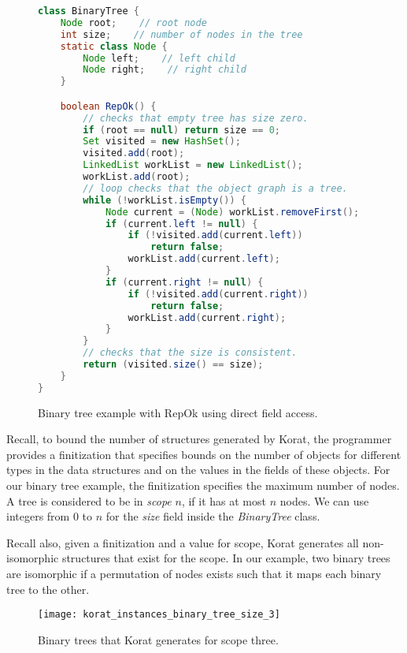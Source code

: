 \begin{figure}
\centering
\begin{lstlisting}[language=Java]
class BinaryTree {
    Node root;    // root node
    int size;    // number of nodes in the tree
    static class Node {
        Node left;    // left child
        Node right;    // right child
    }

    boolean RepOk() {
        // checks that empty tree has size zero.
        if (root == null) return size == 0;
        Set visited = new HashSet();
        visited.add(root);
        LinkedList workList = new LinkedList();
        workList.add(root);
        // loop checks that the object graph is a tree.
        while (!workList.isEmpty()) {
            Node current = (Node) workList.removeFirst();
            if (current.left != null) {
                if (!visited.add(current.left))
                    return false;
                workList.add(current.left);
            }
            if (current.right != null) {
                if (!visited.add(current.right))
                    return false;
                workList.add(current.right);
            }
        }
        // checks that the size is consistent.
        return (visited.size() == size);
    }
}
\end{lstlisting}
\caption{Binary tree example with RepOk using direct field access.}
\label{fig:btreeDirectRepOk}
\end{figure}

\para
Recall, to bound the number of structures generated by Korat, the
programmer provides a finitization that specifies bounds on the number
of objects for different types in the data structures and on the
values in the fields of these objects.  For our binary tree example,
the finitization specifies the maximum number of nodes.  A tree is
considered to be in \emph{scope} $n$, if it has at most $n$ nodes. We
can use integers from 0 to $n$ for the \emph{size} field inside the
\emph{BinaryTree} class.

\para Recall also, given a finitization and a value for scope, Korat
generates all non-isomorphic structures that exist for the scope.  In
our example, two binary trees are isomorphic if a permutation of nodes
exists such that it maps each binary tree to the other.

\begin{figure}
\centering
\texttt{[image: korat\_instances\_binary\_tree\_size\_3]}
\caption{Binary trees that Korat generates for scope three.}
\label{fig:btreeKoratGenScopeThree}
\end{figure}

